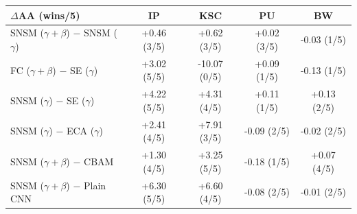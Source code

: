 \begin{tabular}{lcccc}
\toprule
$\Delta$AA (wins/5) & IP & KSC & PU & BW \\
\midrule
SNSM ($\gamma{+}\beta$) $-$ SNSM ($\gamma$) & +0.46 (3/5) & +0.62 (3/5) & +0.02 (3/5) & -0.03 (1/5) \\
FC ($\gamma{+}\beta$) $-$ SE ($\gamma$) & +3.02 (5/5) & -10.07 (0/5) & +0.09 (1/5) & -0.13 (1/5) \\
SNSM ($\gamma$) $-$ SE ($\gamma$) & +4.22 (5/5) & +4.31 (4/5) & +0.11 (1/5) & +0.13 (2/5) \\
SNSM ($\gamma$) $-$ ECA ($\gamma$) & +2.41 (4/5) & +7.91 (3/5) & -0.09 (2/5) & -0.02 (2/5) \\
SNSM ($\gamma{+}\beta$) $-$ CBAM & +1.30 (4/5) & +3.25 (5/5) & -0.18 (1/5) & +0.07 (4/5) \\
SNSM ($\gamma{+}\beta$) $-$ Plain CNN & +6.30 (5/5) & +6.60 (4/5) & -0.08 (2/5) & -0.01 (2/5) \\
\bottomrule
\end{tabular}
